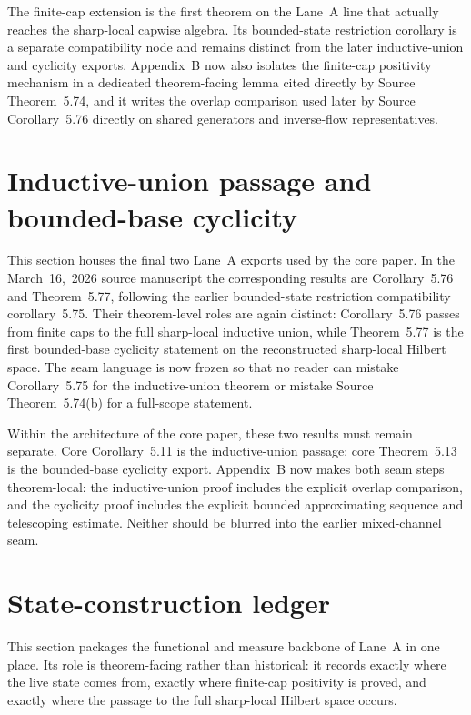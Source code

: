 \documentclass[preprint,aip,jmp,amsmath,amssymb,nofootinbib]{revtex4-2}
\begin{document}

The finite-cap extension is the first theorem on the Lane~A line that actually reaches the sharp-local capwise algebra. Its bounded-state restriction corollary is a separate compatibility node and remains distinct from the later inductive-union and cyclicity exports. Appendix~B now also isolates the finite-cap positivity mechanism in a dedicated theorem-facing lemma cited directly by Source Theorem~5.74, and it writes the overlap comparison used later by Source Corollary~5.76 directly on shared generators and inverse-flow representatives.

\section{Inductive-union passage and bounded-base cyclicity}
This section houses the final two Lane~A exports used by the core paper. In the March~16,~2026 source manuscript the corresponding results are Corollary~5.76 and Theorem~5.77, following the earlier bounded-state restriction compatibility corollary~5.75. Their theorem-level roles are again distinct: Corollary~5.76 passes from finite caps to the full sharp-local inductive union, while Theorem~5.77 is the first bounded-base cyclicity statement on the reconstructed sharp-local Hilbert space. The seam language is now frozen so that no reader can mistake Corollary~5.75 for the inductive-union theorem or mistake Source Theorem~5.74(b) for a full-scope statement.


Within the architecture of the core paper, these two results must remain separate. Core Corollary~5.11 is the inductive-union passage; core Theorem~5.13 is the bounded-base cyclicity export. Appendix~B now makes both seam steps theorem-local: the inductive-union proof includes the explicit overlap comparison, and the cyclicity proof includes the explicit bounded approximating sequence and telescoping estimate. Neither should be blurred into the earlier mixed-channel seam.

\section{State-construction ledger}
This section packages the functional and measure backbone of Lane~A in one place. Its role is theorem-facing rather than historical: it records exactly where the live state comes from, exactly where finite-cap positivity is proved, and exactly where the passage to the full sharp-local Hilbert space occurs.
\end{document}
